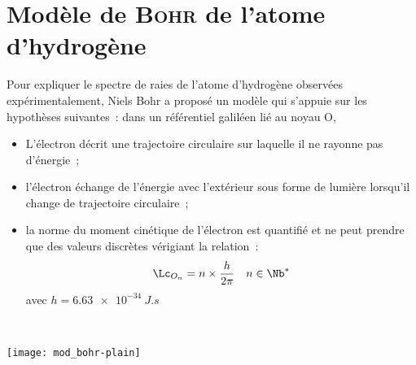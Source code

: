 \documentclass[a4paper, 10pt, final, garamond]{book}
\begin{document}
\resetQ
\section{Modèle de \textsc{Bohr} de l'atome d'hydrogène}
Pour expliquer le spectre de raies de l'atome d'hydrogène observées
expérimentalement, Niels Bohr a proposé un modèle qui s'appuie sur les
hypothèses suivantes~: dans un référentiel galiléen lié au noyau O,
\smallbreak
\noindent
\begin{minipage}[t]{.68\linewidth}
	\begin{itemize}
		\item L'électron décrit une trajectoire circulaire sur laquelle il ne
		      rayonne pas d'énergie~;
		\item l'électron échange de l'énergie avec l'extérieur sous forme de lumière
		      lorsqu'il change de trajectoire circulaire~;
		\item la norme du moment cinétique de l'électron est quantifié et ne peut
		      prendre que des valeurs discrètes vérigiant la relation~:
		      \[
			      \Lc_{O_n} = n \times \frac{h}{2\pi}
			      \quad
			      n \in \Nb^{*}
		      \]
		      avec $h = \SI{6.63e-34}{J.s}$
	\end{itemize}
\end{minipage}
\hfill
\begin{minipage}[t]{.30\linewidth}
	~
	\begin{center}
		\texttt{[image: mod\_bohr-plain]}
	\end{center}
\end{minipage}
\end{document}

